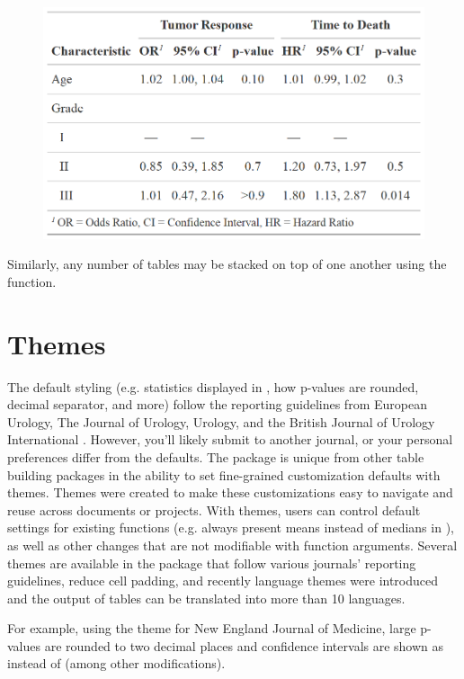 \begin{figure}[h!]
  \includegraphics[scale=0.35]{merge.png}
  \centering
\end{figure}

Similarly, any number of  tables may be stacked on top of one another using the  function.

\section{Themes}

The default styling (e.g. statistics displayed in , how p-values are rounded, decimal separator, and more) follow the reporting guidelines from European Urology, The Journal of Urology, Urology, and the British Journal of Urology International \citep{assel2019guidelines}.
However, you'll likely submit to another journal, or your personal preferences differ from the defaults.
The  package is unique from other table building packages in the ability to set fine-grained customization defaults with themes. 
Themes were created to make these customizations easy to navigate and reuse across documents or projects. 
With themes, users can control default settings for existing functions (e.g. always present means instead of medians in ), as well as other changes that are not modifiable with function arguments.
Several themes are available in the package that follow various journals' reporting guidelines, reduce cell padding, and recently language themes were introduced and the output of  tables can be translated into more than 10 languages.

For example, using the theme for New England Journal of Medicine, large p-values are rounded to two decimal places and confidence intervals are shown as  instead of  (among other modifications). 

